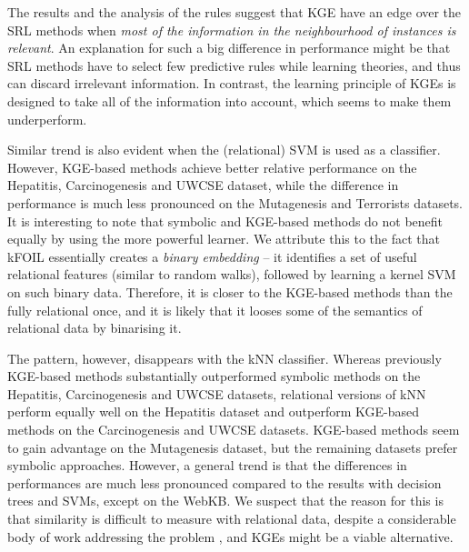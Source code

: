 The results and the analysis of the rules suggest that KGE have an edge over the SRL methods when \textit{most of the information in the neighbourhood of instances is relevant}. 
An explanation for such a big difference in performance might be that SRL methods have to select few predictive rules while learning theories, and thus can discard irrelevant information.
In contrast, the learning principle of KGEs is designed to take all of the information into account, which seems to make them underperform.




Similar trend is also evident when the (relational) SVM is used as a classifier.
However, KGE-based methods achieve better relative performance on the Hepatitis, Carcinogenesis and UWCSE dataset, while the difference in performance is much less pronounced on the Mutagenesis and Terrorists datasets.
It is interesting to note that symbolic and KGE-based methods do not benefit equally by using the more powerful learner.
We attribute this to the fact that kFOIL essentially creates a \textit{binary embedding} -- it identifies a set of useful relational features (similar to random walks), followed by learning a kernel SVM on such binary data.
Therefore,  it is closer to the KGE-based methods than the fully relational once, and it is likely that it looses some of the semantics of relational data by binarising it.



The pattern, however, disappears with the kNN classifier.
Whereas previously KGE-based methods substantially outperformed symbolic methods on the Hepatitis, Carcinogenesis and UWCSE datasets, relational versions of kNN perform equally well on the Hepatitis dataset and outperform KGE-based methods on the Carcinogenesis and UWCSE datasets.
KGE-based methods seem to gain advantage on the Mutagenesis dataset, but the remaining datasets prefer symbolic approaches.
However, a general trend is that the differences in performances are much less pronounced compared to the results with decision trees and SVMs, except on the WebKB.
We suspect that the reason for this is that similarity is difficult to measure with relational data, despite a considerable body of work addressing the problem \cite{DumancicMLJ2017}, and KGEs might be a viable alternative. 



